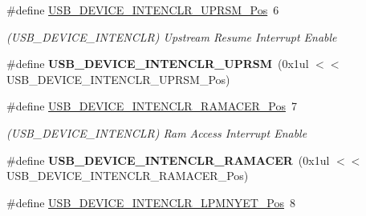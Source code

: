\begin{DoxyCompactItemize}
\item 
\hypertarget{group___s_a_m_l21___u_s_b_gaf00a9cc7618b7addca1818fbd652a2bb}{}\#define \hyperlink{group___s_a_m_l21___u_s_b_gaf00a9cc7618b7addca1818fbd652a2bb}{U\+S\+B\+\_\+\+D\+E\+V\+I\+C\+E\+\_\+\+I\+N\+T\+E\+N\+C\+L\+R\+\_\+\+U\+P\+R\+S\+M\+\_\+\+Pos}~6\label{group___s_a_m_l21___u_s_b_gaf00a9cc7618b7addca1818fbd652a2bb}

\begin{DoxyCompactList}\small\item\em (U\+S\+B\+\_\+\+D\+E\+V\+I\+C\+E\+\_\+\+I\+N\+T\+E\+N\+C\+L\+R) Upstream Resume Interrupt Enable \end{DoxyCompactList}\item 
\hypertarget{group___s_a_m_l21___u_s_b_ga207564a9215a2264e14f23853371d9e5}{}\#define {\bfseries U\+S\+B\+\_\+\+D\+E\+V\+I\+C\+E\+\_\+\+I\+N\+T\+E\+N\+C\+L\+R\+\_\+\+U\+P\+R\+S\+M}~(0x1ul $<$$<$ U\+S\+B\+\_\+\+D\+E\+V\+I\+C\+E\+\_\+\+I\+N\+T\+E\+N\+C\+L\+R\+\_\+\+U\+P\+R\+S\+M\+\_\+\+Pos)\label{group___s_a_m_l21___u_s_b_ga207564a9215a2264e14f23853371d9e5}

\item 
\hypertarget{group___s_a_m_l21___u_s_b_ga9e66d87d6859bb7a3e1712977aa54df1}{}\#define \hyperlink{group___s_a_m_l21___u_s_b_ga9e66d87d6859bb7a3e1712977aa54df1}{U\+S\+B\+\_\+\+D\+E\+V\+I\+C\+E\+\_\+\+I\+N\+T\+E\+N\+C\+L\+R\+\_\+\+R\+A\+M\+A\+C\+E\+R\+\_\+\+Pos}~7\label{group___s_a_m_l21___u_s_b_ga9e66d87d6859bb7a3e1712977aa54df1}

\begin{DoxyCompactList}\small\item\em (U\+S\+B\+\_\+\+D\+E\+V\+I\+C\+E\+\_\+\+I\+N\+T\+E\+N\+C\+L\+R) Ram Access Interrupt Enable \end{DoxyCompactList}\item 
\hypertarget{group___s_a_m_l21___u_s_b_ga86b5a35403d7c7a916b345a3f76f5f2f}{}\#define {\bfseries U\+S\+B\+\_\+\+D\+E\+V\+I\+C\+E\+\_\+\+I\+N\+T\+E\+N\+C\+L\+R\+\_\+\+R\+A\+M\+A\+C\+E\+R}~(0x1ul $<$$<$ U\+S\+B\+\_\+\+D\+E\+V\+I\+C\+E\+\_\+\+I\+N\+T\+E\+N\+C\+L\+R\+\_\+\+R\+A\+M\+A\+C\+E\+R\+\_\+\+Pos)\label{group___s_a_m_l21___u_s_b_ga86b5a35403d7c7a916b345a3f76f5f2f}

\item 
\hypertarget{group___s_a_m_l21___u_s_b_gaba9233a85f6c1ff252fb8860e0406c66}{}\#define \hyperlink{group___s_a_m_l21___u_s_b_gaba9233a85f6c1ff252fb8860e0406c66}{U\+S\+B\+\_\+\+D\+E\+V\+I\+C\+E\+\_\+\+I\+N\+T\+E\+N\+C\+L\+R\+\_\+\+L\+P\+M\+N\+Y\+E\+T\+\_\+\+Pos}~8\label{group___s_a_m_l21___u_s_b_gaba9233a85f6c1ff252fb8860e0406c66}


\end{DoxyCompactItemize}
